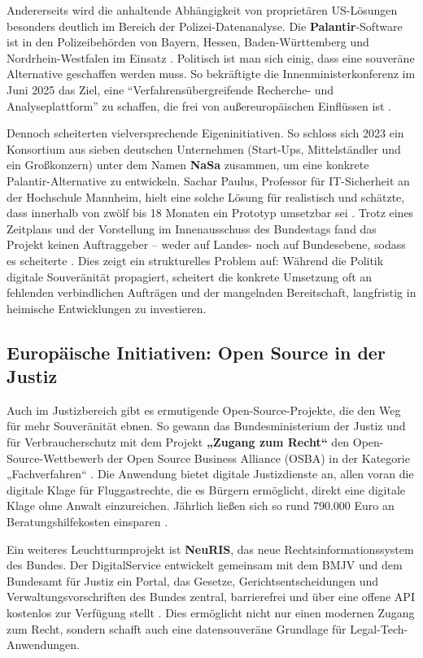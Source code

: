 \documentclass[12pt,a4paper]{article}
\begin{document}
	Andererseits wird die anhaltende Abhängigkeit von proprietären US-Lösungen besonders deutlich im Bereich der Polizei-Datenanalyse. Die \textbf{Palantir}-Software ist in den Polizeibehörden von Bayern, Hessen, Baden-Württemberg und Nordrhein-Westfalen im Einsatz \cite{Tagesschau2025b}. Politisch ist man sich einig, dass eine souveräne Alternative geschaffen werden muss. So bekräftigte die Innenministerkonferenz im Juni 2025 das Ziel, eine \enquote{Verfahrensübergreifende Recherche- und Analyseplattform} zu schaffen, die frei von außereuropäischen Einflüssen ist \cite{Tagesschau2025b}.
	
	Dennoch scheiterten vielversprechende Eigeninitiativen. So schloss sich 2023 ein Konsortium aus sieben deutschen Unternehmen (Start-Ups, Mittelständler und ein Großkonzern) unter dem Namen \textbf{NaSa} zusammen, um eine konkrete Palantir-Alternative zu entwickeln. Sachar Paulus, Professor für IT-Sicherheit an der Hochschule Mannheim, hielt eine solche Lösung für realistisch und schätzte, dass innerhalb von zwölf bis 18 Monaten ein Prototyp umsetzbar sei \cite{Tagesschau2025b}. Trotz eines Zeitplans und der Vorstellung im Innenausschuss des Bundestags fand das Projekt keinen Auftraggeber – weder auf Landes- noch auf Bundesebene, sodass es scheiterte \cite{Tagesschau2025b}. Dies zeigt ein strukturelles Problem auf: Während die Politik digitale Souveränität propagiert, scheitert die konkrete Umsetzung oft an fehlenden verbindlichen Aufträgen und der mangelnden Bereitschaft, langfristig in heimische Entwicklungen zu investieren.
	
	\subsection{Europäische Initiativen: Open Source in der Justiz}
	
	Auch im Justizbereich gibt es ermutigende Open-Source-Projekte, die den Weg für mehr Souveränität ebnen. So gewann das Bundesministerium der Justiz und für Verbraucherschutz mit dem Projekt \textbf{„Zugang zum Recht“} den Open-Source-Wettbewerb der Open Source Business Alliance (OSBA) in der Kategorie „Fachverfahren“ \cite{Heise2025c}. Die Anwendung bietet digitale Justizdienste an, allen voran die digitale Klage für Fluggastrechte, die es Bürgern ermöglicht, direkt eine digitale Klage ohne Anwalt einzureichen. Jährlich ließen sich so rund 790.000 Euro an Beratungshilfekosten einsparen \cite{Heise2025c}.
	
	Ein weiteres Leuchtturmprojekt ist \textbf{NeuRIS}, das neue Rechtsinformationssystem des Bundes. Der DigitalService entwickelt gemeinsam mit dem BMJV und dem Bundesamt für Justiz ein Portal, das Gesetze, Gerichtsentscheidungen und Verwaltungsvorschriften des Bundes zentral, barrierefrei und über eine offene API kostenlos zur Verfügung stellt \cite{NeuRIS2025}. Dies ermöglicht nicht nur einen modernen Zugang zum Recht, sondern schafft auch eine datensouveräne Grundlage für Legal-Tech-Anwendungen.
	
\end{document}
